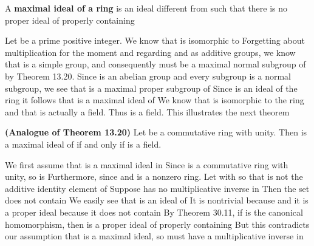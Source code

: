 \documentclass[11pt,oneside]{article}
\begin{document}
\begin{BookBody}
 A\textbf{ maximal ideal of a ring}  is an ideal  different from  such that there is no proper ideal  of  properly containing \BookEnd{\blacksquare}

 Let  be a prime positive integer. We know that  is isomorphic to  Forgetting about multiplication for the moment and regarding  and  as additive groups, we know that  is a simple group, and consequently  must be a maximal normal subgroup of  by Theorem 13.20. Since  is an abelian group and every subgroup is a normal subgroup, we see that  is a maximal proper subgroup of  Since  is an ideal of the ring  it follows that  is a maximal ideal of  We know that  is isomorphic to the ring  and that  is actually a field. Thus  is a field. This illustrates the next theorem\BookEnd{\blacktriangle}

 \textbf{(Analogue of Theorem 13.20)} Let  be a commutative ring with unity. Then  is a maximal ideal of  if and only if  is a field.

 We first assume that  is a maximal ideal in  Since  is a commutative ring with unity, so is  Furthermore, since  and  is a nonzero ring. Let  with  so that  is not the additive identity element of  Suppose  has no multiplicative inverse in  Then the set  does not contain  We easily see that  is an ideal of  It is nontrivial because  and it is a 
proper ideal because it does not contain  By Theorem 30.11, if  is the canonical homomorphism, then  is a proper ideal of  properly containing  But this contradicts our assumption that  is a maximal ideal, so  must have a multiplicative inverse in 

\end{BookBody}
\end{document}
